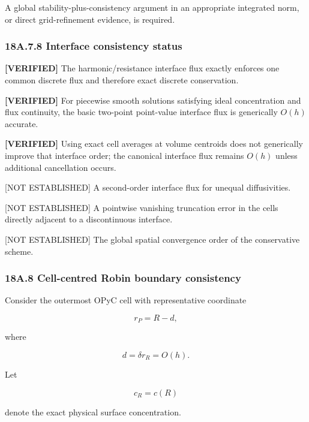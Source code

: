 \documentclass[11pt,a4paper]{article}
\begin{document}
A global stability-plus-consistency argument in an appropriate integrated norm, or direct grid-refinement evidence, is required.

\subsubsection*{18A.7.8 Interface consistency status}

\textbf{[VERIFIED]} The harmonic/resistance interface flux exactly enforces one common discrete flux and therefore exact discrete conservation.

\textbf{[VERIFIED]} For piecewise smooth solutions satisfying ideal concentration and flux continuity, the basic two-point point-value interface flux is generically $O(h)$ accurate.

\textbf{[VERIFIED]} Using exact cell averages at volume centroids does not generically improve that interface order; the canonical interface flux remains $O(h)$ unless additional cancellation occurs.

[NOT ESTABLISHED] A second-order interface flux for unequal diffusivities.

[NOT ESTABLISHED] A pointwise vanishing truncation error in the cells directly adjacent to a discontinuous interface.

[NOT ESTABLISHED] The global spatial convergence order of the conservative scheme.

\subsubsection*{18A.8 Cell-centred Robin boundary consistency}

Consider the outermost OPyC cell with representative coordinate

\begin{equation}
r_P=R-d,
\tag{TRISO-ACC-220}
\label{eq:triso-acc-220}
\end{equation}

where

\begin{equation}
d=\delta r_R=O(h).
\tag{TRISO-ACC-221}
\label{eq:triso-acc-221}
\end{equation}

Let

\begin{equation}
c_R=c(R)
\tag{TRISO-ACC-222}
\label{eq:triso-acc-222}
\end{equation}

denote the exact physical surface concentration.
\end{document}
